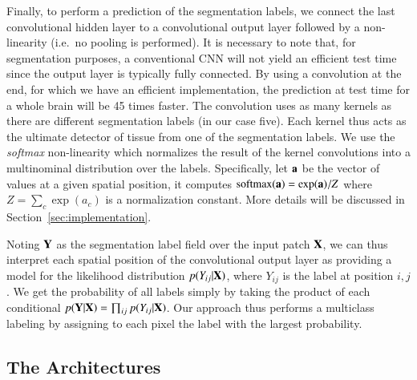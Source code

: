 \documentclass[final,5p,times,twocolumn]{elsarticle}
\begin{document}


Finally, to perform a prediction of the segmentation labels, we connect the last convolutional hidden layer to a convolutional output layer followed by a non-linearity (i.e.\ no pooling is performed).  It is necessary to note that, %
for segmentation purposes, a conventional CNN will not yield an efficient test time since the output layer is typically fully connected. By using a convolution at the end, for which we have an efficient implementation, the prediction at test time for a whole brain will be 45 times faster.
The convolution uses as many kernels as there are different segmentation labels (in our case five). Each kernel thus acts as the ultimate detector of tissue from one of the segmentation labels. We use the {\it softmax} non-linearity which normalizes the result of the kernel convolutions into a multinominal distribution over the labels. Specifically, let ${\bf a}$ be the vector of values at a given spatial position, it computes ${\rm softmax}({\bf a}) = \exp({\bf a})/Z$ where $Z=\sum_c \exp(a_c)$ is a normalization constant.  More details will be discussed in Section~\ref{sec:implementation}.



Noting ${\bf Y}$ as the segmentation label field over the input patch ${\bf X}$, we can thus interpret each spatial position of the convolutional output layer as providing a model for the likelihood distribution $p(Y_{ij}|{\bf X})$, where $Y_{ij}$ is the label at position $i,j$. We get the probability of all labels simply by taking the product of each conditional $p({\bf Y}|{\bf X}) = \prod_{ij} p(Y_{ij}|{\bf X})$. Our approach thus performs a multiclass labeling by assigning to each pixel the label with the largest probability. 


\subsection{The Architectures}
\end{document}
